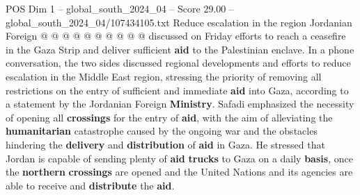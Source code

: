 \begin{textsample}{POS Dim 1 – global\_south\_2024\_04 – Score 29.00 – global\_south\_2024\_04/107434105.txt}
Reduce escalation in the region Jordanian Foreign @ @ @ @ @ @ @ @ @ @ discussed on Friday efforts to reach a ceasefire in the Gaza Strip and deliver sufficient \textbf{aid} to the Palestinian enclave.
In a phone conversation, the two sides discussed regional developments and efforts to reduce escalation in the Middle East region, stressing the priority of removing all restrictions on the entry of sufficient and immediate \textbf{aid} into Gaza, according to a statement by the Jordanian Foreign \textbf{Ministry}.
Safadi emphasized the necessity of opening all \textbf{crossings} for the entry of \textbf{aid}, with the aim of alleviating the \textbf{humanitarian} catastrophe caused by the ongoing war and the obstacles hindering the \textbf{delivery} and \textbf{distribution} of \textbf{aid} in Gaza.
He stressed that Jordan is capable of sending plenty of \textbf{aid} \textbf{trucks} to Gaza on a daily \textbf{basis}, once the \textbf{northern} \textbf{crossings} are opened and the United Nations and its agencies are able to receive and \textbf{distribute} the \textbf{aid}.

\end{textsample}
